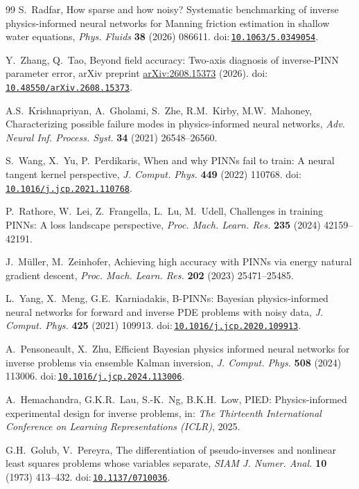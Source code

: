\documentclass[preprint,11pt]{elsarticle}
\newcommand{\doi}[1]{doi:\,\mbox{\href{https://doi.org/#1}{\nolinkurl{#1}}}}
\begin{document}
\begin{thebibliography}{99}
S.~Radfar,
How sparse and how noisy? Systematic benchmarking of inverse physics-informed neural networks for Manning friction estimation in shallow water equations,
\textit{Phys. Fluids} \textbf{38} (2026) 086611.
\doi{10.1063/5.0349054}.

Y.~Zhang, Q.~Tao,
Beyond field accuracy: Two-axis diagnosis of inverse-PINN parameter error,
arXiv preprint \href{https://arxiv.org/abs/2608.15373}{arXiv:2608.15373} (2026).
\doi{10.48550/arXiv.2608.15373}.

A.S.~Krishnapriyan, A.~Gholami, S.~Zhe, R.M.~Kirby, M.W.~Mahoney,
Characterizing possible failure modes in physics-informed neural networks,
\textit{Adv. Neural Inf. Process. Syst.} \textbf{34} (2021) 26548--26560.

S.~Wang, X.~Yu, P.~Perdikaris,
When and why PINNs fail to train: A neural tangent kernel perspective,
\textit{J. Comput. Phys.} \textbf{449} (2022) 110768.
\doi{10.1016/j.jcp.2021.110768}.

P.~Rathore, W.~Lei, Z.~Frangella, L.~Lu, M.~Udell,
Challenges in training PINNs: A loss landscape perspective,
\textit{Proc. Mach. Learn. Res.} \textbf{235} (2024) 42159--42191.

J.~M\"uller, M.~Zeinhofer,
Achieving high accuracy with PINNs via energy natural gradient descent,
\textit{Proc. Mach. Learn. Res.} \textbf{202} (2023) 25471--25485.

L.~Yang, X.~Meng, G.E.~Karniadakis,
B-PINNs: Bayesian physics-informed neural networks for forward and inverse PDE problems with noisy data,
\textit{J. Comput. Phys.} \textbf{425} (2021) 109913.
\doi{10.1016/j.jcp.2020.109913}.

A.~Pensoneault, X.~Zhu,
Efficient Bayesian physics informed neural networks for inverse problems via ensemble Kalman inversion,
\textit{J. Comput. Phys.} \textbf{508} (2024) 113006.
\doi{10.1016/j.jcp.2024.113006}.

A.~Hemachandra, G.K.R.~Lau, S.-K.~Ng, B.K.H.~Low,
PIED: Physics-informed experimental design for inverse problems,
in: \textit{The Thirteenth International Conference on Learning Representations (ICLR)}, 2025.

G.H.~Golub, V.~Pereyra,
The differentiation of pseudo-inverses and nonlinear least squares problems whose variables separate,
\textit{SIAM J. Numer. Anal.} \textbf{10} (1973) 413--432.
\doi{10.1137/0710036}.


\end{thebibliography}
\end{document}

